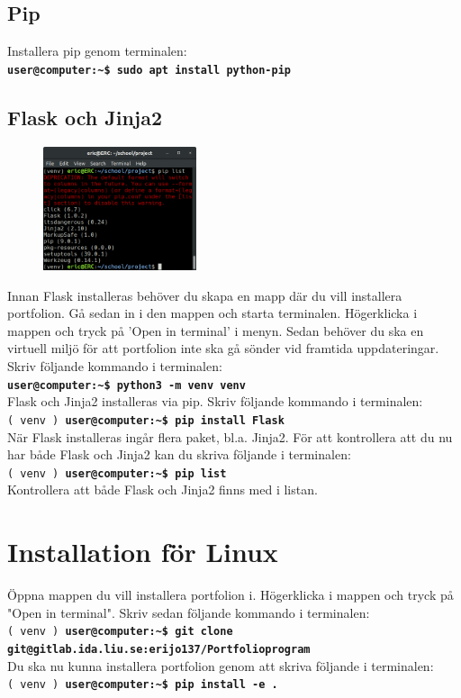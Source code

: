 \documentclass{TDP003mall}
\begin{document}
\subsection{Pip}
Installera pip genom terminalen:\\
\texttt{\textbf{\textcolor{terminalgreen}{user@computer}:\~{}\$ sudo apt install python-pip}}\\

\newpage
\subsection{Flask och Jinja2}
\begin{figure}
    \begin{center}
        \includegraphics[width=0.40\textwidth]{./list2.png}
    \end{center}
\end{figure}
Innan Flask installeras behöver du skapa en mapp där du vill installera portfolion. Gå sedan in i den mappen och starta terminalen. Högerklicka i mappen och tryck på 'Open in terminal' i menyn. Sedan behöver du ska en virtuell miljö för att portfolion inte ska gå sönder vid framtida uppdateringar. Skriv följande kommando i terminalen:\\
\texttt{\textbf{\textcolor{terminalgreen}{user@computer}:\~{}\$ python3 -m venv venv}}\\
Flask och Jinja2 installeras via pip. Skriv följande kommando i terminalen:\\
\texttt{( venv ) \textbf{\textcolor{terminalgreen}{user@computer}:\~{}\$ pip install Flask}}\\
När Flask installeras ingår flera paket, bl.a. Jinja2.
För att kontrollera att du nu har både Flask och Jinja2 kan du skriva följande i terminalen:\\
\texttt{( venv ) \textbf{\textcolor{terminalgreen}{user@computer}:\~{}\$ pip list}}\\
Kontrollera att både Flask och Jinja2 finns med i listan.
\section{Installation för Linux}
Öppna mappen du vill installera portfolion i. Högerklicka i mappen och tryck på "Open in terminal". Skriv sedan följande kommando i terminalen:\\
\texttt{( venv ) \textbf{\textcolor{terminalgreen}{user@computer}:\~{}\$ git clone git@gitlab.ida.liu.se:erijo137/Portfolioprogram}}\\
Du ska nu kunna installera portfolion genom att skriva följande i terminalen:\\
\texttt{( venv ) \textbf{\textcolor{terminalgreen}{user@computer}:\~{}\$ pip install -e .}}\\
\end{document}
